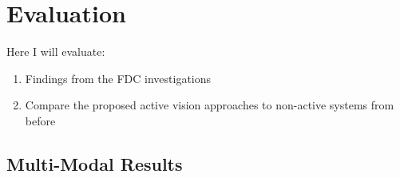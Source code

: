 \chapter{Evaluation}
Here I will evaluate:
\begin{enumerate}
  \item Findings from the FDC investigations
  \item Compare the proposed active vision approaches to non-active systems from before
\end{enumerate}





\section{Multi-Modal Results}

  

  
  
  

  





